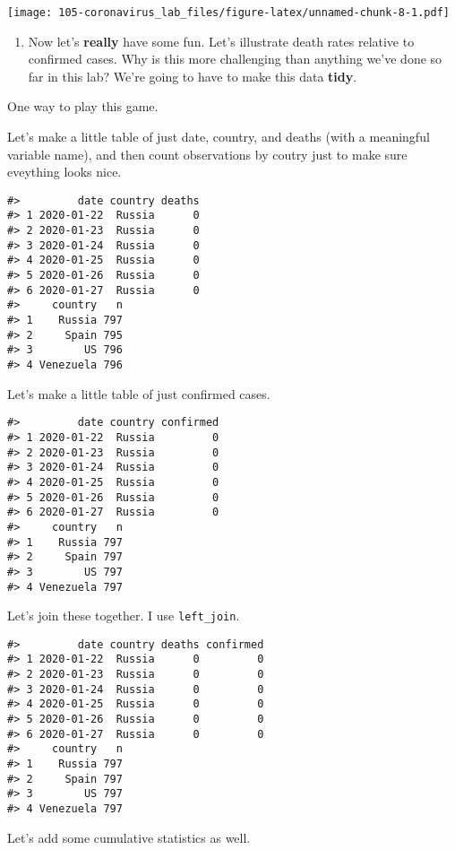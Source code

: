 \documentclass[
]{book}
\providecommand{\tightlist}{%
  \setlength{\itemsep}{0pt}\setlength{\parskip}{0pt}}
\begin{document}
\texttt{[image: 105-coronavirus\_lab\_files/figure-latex/unnamed-chunk-8-1.pdf]}

\begin{enumerate}
\def\labelenumi{\arabic{enumi}.}
\setcounter{enumi}{6}
\tightlist
\item
  Now let's \textbf{really} have some fun. Let's illustrate death rates relative to confirmed cases. Why is this more challenging than anything we've done so far in this lab? We're going to have to make this data \textbf{tidy}.
\end{enumerate}

One way to play this game.

Let's make a little table of just date, country, and deaths (with a meaningful variable name), and then count observations by coutry just to make sure eveything looks nice.

\begin{verbatim}
#>         date country deaths
#> 1 2020-01-22  Russia      0
#> 2 2020-01-23  Russia      0
#> 3 2020-01-24  Russia      0
#> 4 2020-01-25  Russia      0
#> 5 2020-01-26  Russia      0
#> 6 2020-01-27  Russia      0
#>     country   n
#> 1    Russia 797
#> 2     Spain 795
#> 3        US 796
#> 4 Venezuela 796
\end{verbatim}

Let's make a little table of just confirmed cases.

\begin{verbatim}
#>         date country confirmed
#> 1 2020-01-22  Russia         0
#> 2 2020-01-23  Russia         0
#> 3 2020-01-24  Russia         0
#> 4 2020-01-25  Russia         0
#> 5 2020-01-26  Russia         0
#> 6 2020-01-27  Russia         0
#>     country   n
#> 1    Russia 797
#> 2     Spain 797
#> 3        US 797
#> 4 Venezuela 797
\end{verbatim}

Let's join these together. I use \texttt{left\_join}.

\begin{verbatim}
#>         date country deaths confirmed
#> 1 2020-01-22  Russia      0         0
#> 2 2020-01-23  Russia      0         0
#> 3 2020-01-24  Russia      0         0
#> 4 2020-01-25  Russia      0         0
#> 5 2020-01-26  Russia      0         0
#> 6 2020-01-27  Russia      0         0
#>     country   n
#> 1    Russia 797
#> 2     Spain 797
#> 3        US 797
#> 4 Venezuela 797
\end{verbatim}

Let's add some cumulative statistics as well.
\end{document}
